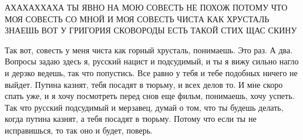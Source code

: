 АХАХАХХАХА ТЫ ЯВНО НА МОЮ СОВЕСТЬ НЕ ПОХОЖ ПОТОМУ ЧТО МОЯ СОВЕСТЬ СО МНОЙ И МОЯ
СОВЕСТЬ ЧИСТА КАК ХРУСТАЛЬ ЗНАЕШЬ ВОТ У ГРИГОРИЯ СКОВОРОДЫ ЕСТЬ ТАКОЙ СТИХ ЩАС
СКИНУ

Так вот, совесть у меня чиста как горный хрусталь, понимаешь. Это раз. А два.
Вопросы задаю здесь я, русский нацист и подсудимый, и ты я вижу сильно нагло и
дерзко ведешь, так что попустись. Все равно у тебя и тебе подобных ничего не
выйдет. Путина казнят, тебя посадят в тюрьму, и всех делов то. И мне скоро
спать уже, и я хочу посмотреть перед снов еще фильм, понимаешь, хочу успеть.
Так что русский подсудимый и мерзавец, думай о том, что ты будешь делать, когда
путина казнят, а тебя посадят в тюрьму. Потому что если ты не исправишься, то
так оно и будет, поверь.



